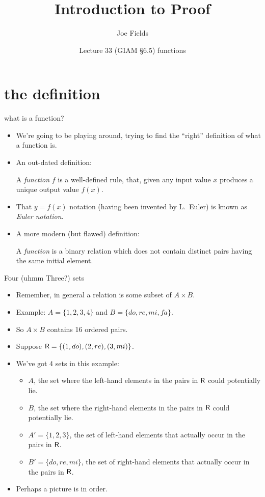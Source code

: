 \documentclass[handout,landscape]{beamer}
\author{Joe Fields}
\title{Introduction to Proof}
\date{Lecture 33 (GIAM \S 6.5) \newline functions}
\institute[SCSU]{ {\tt fieldsj1@southernct.edu} }
\begin{document}
\begin{frame}[plain]
  \titlepage
\end{frame}

\section{the definition}

\begin{frame}{what is a function?}
\begin{itemize}
\item We're going to be playing around, trying to find the ``right'' definition of what a function is. \pause
\item An out-dated definition:\pause \newline
\begin{defi}
 A \emph{function} $f$ is a well-defined rule, that, given any input
value $x$ produces a unique output value $f(x)$.
\end{defi}
\pause
\item That $y=f(x)$ notation (having been invented by L.\ Euler) is known as {\em Euler notation}. \pause
\item A more modern (but flawed) definition:\pause
\begin{defi}
 A \emph{function} is a binary relation which does not contain
distinct pairs having the same initial element.
\end{defi}
\end{itemize}
\end{frame}

\begin{frame}{Four (uhmm Three?) sets}
\begin{itemize}
\item Remember, in general a relation is some subset of $A \times B$. \pause
\item Example: $A = \{1, 2, 3, 4\}$ and $B = \{do, re, mi, fa \}$.  \pause
\item So $A\times B$ contains 16 ordered pairs. \pause
\item Suppose $\mbox{\textsf R} = \{ (1,do), (2, re), (3, mi) \}$. \pause
\item We've got 4 sets in this example: \pause
\begin{itemize}
  \item $A$, the set where the left-hand elements in the pairs in $\mbox{\textsf R}$ could potentially lie. \pause
  \item $B$, the set where the right-hand elements in the pairs in $\mbox{\textsf R}$ could potentially lie.\pause
  \item $A' = \{1, 2, 3\}$, the set of left-hand elements that actually occur in the pairs in $\mbox{\textsf R}$. \pause
  \item $B' = \{do, re, mi\}$, the set of right-hand elements that actually occur in the pairs in $\mbox{\textsf R}$. \pause
\end{itemize}
\item Perhaps a picture is in order.
\end{itemize}
\end{frame}
\end{document}
